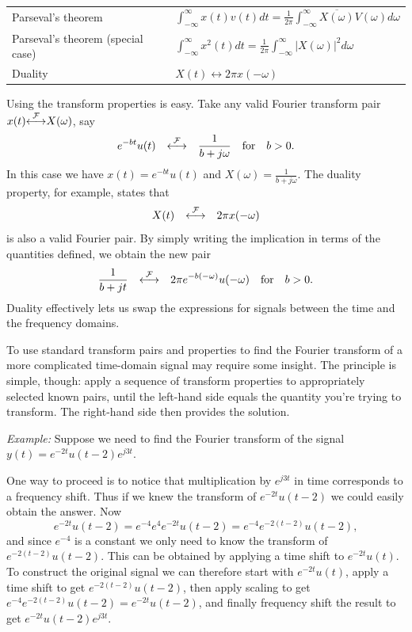 \documentclass[10pt]{beamer}
\newcommand{\ftpair}{{\stackrel{\cal F}{\longleftrightarrow}}}
\begin{document}
\begin{center}
{\begin{minipage}{0.9\textwidth}
\begin{tabular}[h]{ll}
  Parseval's theorem &
  $\int_{-\infty}^{\infty} x(t) v(t) dt = \frac{1}{2\pi}
  \int_{-\infty}^{\infty} \overline{X(\omega)} V(\omega) d\omega$ \\

  Parseval's theorem (special case) &
  $\int_{-\infty}^{\infty} x^2(t) dt = \frac{1}{2\pi}
  \int_{-\infty}^{\infty} |X(\omega)|^2 d\omega$ \\

  Duality &
  $X(t) \leftrightarrow 2\pi x(-\omega)$ \\

\end{tabular}
\end{minipage}
}
\end{center}

Using the transform properties is easy.  Take any valid Fourier transform pair $x(t) \ftpair X(\omega)$, say
\begin{equation*}
  e^{-bt} u(t) \quad \ftpair \quad \frac{1}{b + j \omega} \quad \text{for} \quad b>0.
\end{equation*}
In this case we have $x(t) = e^{-bt} u(t)$ and $X(\omega) = \frac{1}{b + j \omega}$.  The duality property, for example, states that
\begin{equation*}
  X(t) \quad \ftpair \quad 2 \pi x(-\omega)
\end{equation*}
is also a valid Fourier pair.  By simply writing the implication in terms of the quantities defined, we obtain the new pair
\begin{equation*}
  \frac{1}{b + j t} \quad \ftpair \quad 2 \pi e^{-b(-\omega)} u(-\omega) \quad \text{for} \quad b>0.
\end{equation*}
Duality effectively lets us swap the expressions for signals between the time and the frequency domains.

To use standard transform pairs and properties to find the Fourier transform of a more complicated time-domain signal may require some insight.  The principle is simple, though:  apply a sequence of transform properties to appropriately selected known pairs, until the left-hand side equals the quantity you're trying to transform.  The right-hand side then provides the solution.

{\em Example:}  Suppose we need to find the Fourier transform of the signal $y(t) = e^{-2t} u(t-2) e^{j 3 t}$.  

One way to proceed is to notice that multiplication by $e^{j 3 t}$ in time corresponds to a frequency shift.  Thus if we knew the transform of $e^{-2t} u(t-2)$ we could easily obtain the answer.  Now 
\begin{equation*}
  e^{-2t} u(t-2) = e^{-4} e^4 e^{-2t} u(t-2) = e^{-4} e^{-2(t-2)} u(t-2),
\end{equation*}
and since $e^{-4}$ is a constant we only need to know the transform of $e^{-2(t-2)} u(t-2)$.  This can be obtained by applying a time shift to $e^{-2t} u(t)$.  To construct the original signal we can therefore start with $e^{-2t} u(t)$, apply a time shift to get $e^{-2(t-2)} u(t-2)$, then apply scaling to get $e^{-4} e^{-2(t-2)} u(t-2) = e^{-2t} u(t-2)$, and finally frequency shift the result to get $e^{-2t} u(t-2) e^{j 3 t}$.
\end{document}
